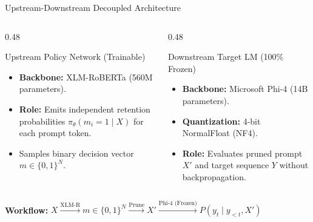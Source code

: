 \documentclass[aspectratio=169,10pt]{beamer}
\begin{document}
\begin{frame}{Upstream-Downstream Decoupled Architecture}
  \begin{columns}[c]
    \begin{column}{0.48\textwidth}
      \begin{block}{Upstream Policy Network (Trainable)}
        \begin{itemize}
          \item \textbf{Backbone:} XLM-RoBERTa (560M parameters).
          \item \textbf{Role:} Emits independent retention probabilities $\pi_\theta(m_i = 1 \mid X)$ for each prompt token.
          \item Samples binary decision vector $m \in \{0, 1\}^N$.
        \end{itemize}
      \end{block}
    \end{column}
    \begin{column}{0.48\textwidth}
      \begin{block}{Downstream Target LM (100\% Frozen)}
        \begin{itemize}
          \item \textbf{Backbone:} Microsoft Phi-4 (14B parameters).
          \item \textbf{Quantization:} 4-bit NormalFloat (NF4).
          \item \textbf{Role:} Evaluates pruned prompt $X'$ and target sequence $Y$ without backpropagation.
        \end{itemize}
      \end{block}
    \end{column}
  \end{columns}
  \vspace{0.4cm}
  \centering
  \textbf{Workflow:} $X \xrightarrow{\text{XLM-R}} m \in \{0, 1\}^N \xrightarrow{\text{Prune}} X' \xrightarrow{\text{Phi-4 (Frozen)}} P(y_t \mid y_{<t}, X')$
\end{frame}
\end{document}
